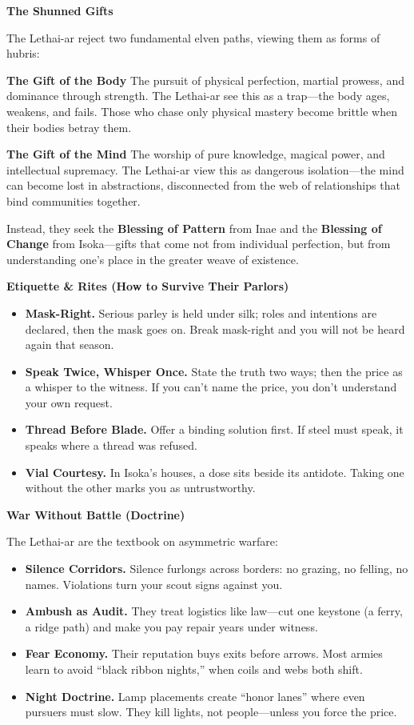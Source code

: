 \documentclass[11pt]{article}
\begin{document}
  \bigskip
  
  \textbf{The Shunned Gifts}
  
  The Lethai-ar reject two fundamental elven paths, viewing them as forms of hubris:
  
  \textbf{The Gift of the Body}  
  The pursuit of physical perfection, martial prowess, and dominance through strength. The Lethai-ar see this as a trap---the body ages, weakens, and fails. Those who chase only physical mastery become brittle when their bodies betray them.
  
  \textbf{The Gift of the Mind}  
  The worship of pure knowledge, magical power, and intellectual supremacy. The Lethai-ar view this as dangerous isolation---the mind can become lost in abstractions, disconnected from the web of relationships that bind communities together.
  
  Instead, they seek the \textbf{Blessing of Pattern} from Inae and the \textbf{Blessing of Change} from Isoka---gifts that come not from individual perfection, but from understanding one's place in the greater weave of existence.
  
  \bigskip
  
  \textbf{Etiquette \& Rites (How to Survive Their Parlors)}
  \begin{itemize}
  \item \textbf{Mask-Right.} Serious parley is held under silk; roles and intentions are declared, then the mask goes on. Break mask-right and you will not be heard again that season.
  \item \textbf{Speak Twice, Whisper Once.} State the truth two ways; then the price as a whisper to the witness. If you can't name the price, you don't understand your own request.
  \item \textbf{Thread Before Blade.} Offer a binding solution first. If steel must speak, it speaks where a thread was refused.
  \item \textbf{Vial Courtesy.} In Isoka's houses, a dose sits beside its antidote. Taking one without the other marks you as untrustworthy.
  \end{itemize}
  
  \bigskip
  
  \textbf{War Without Battle (Doctrine)}
  
  The Lethai-ar are the textbook on asymmetric warfare:
  \begin{itemize}
  \item \textbf{Silence Corridors.} Silence furlongs across borders: no grazing, no felling, no names. Violations turn your scout signs against you.
  \item \textbf{Ambush as Audit.} They treat logistics like law---cut one keystone (a ferry, a ridge path) and make you pay repair years under witness.
  \item \textbf{Fear Economy.} Their reputation buys exits before arrows. Most armies learn to avoid ``black ribbon nights,'' when coils and webs both shift.
  \item \textbf{Night Doctrine.} Lamp placements create ``honor lanes'' where even pursuers must slow. They kill lights, not people---unless you force the price.
  \end{itemize}
  
\end{document}
